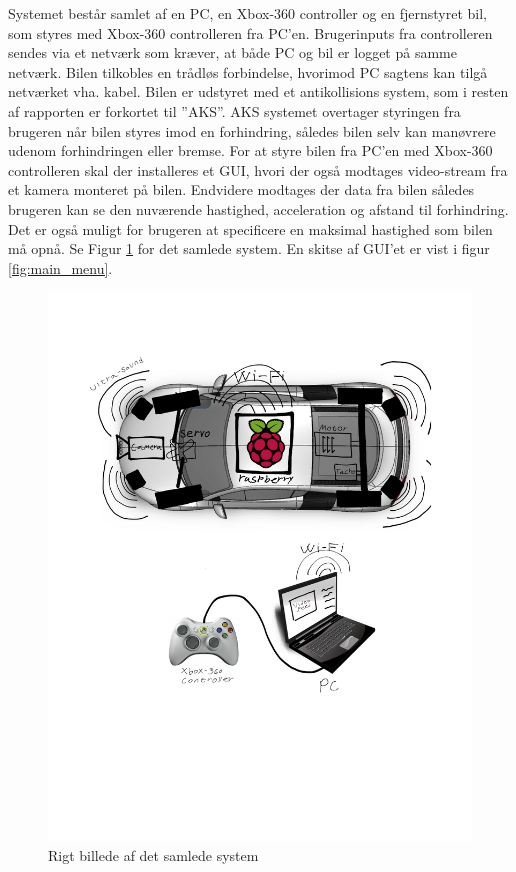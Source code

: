 Systemet består samlet af en PC, en Xbox-360 controller og en fjernstyret bil, som styres med Xbox-360 controlleren fra PC'en. Brugerinputs fra controlleren sendes via et netværk som kræver, at både PC og bil er logget på samme netværk. Bilen tilkobles en trådløs forbindelse, hvorimod PC sagtens kan tilgå netværket vha. kabel. Bilen er udstyret med et antikollisions system, som i resten af rapporten er forkortet til ''AKS''. AKS systemet overtager styringen fra brugeren når bilen styres imod en forhindring, således bilen selv kan manøvrere udenom forhindringen eller bremse. For at styre bilen fra PC'en med Xbox-360 controlleren skal der installeres et GUI, hvori der også modtages video-stream fra et kamera monteret på bilen. Endvidere modtages der data fra bilen således brugeren kan se den nuværende hastighed, acceleration og afstand til forhindring. Det er også muligt for brugeren at specificere en maksimal hastighed som bilen må opnå. Se Figur \ref{fig:rigbillede} for det samlede system. En skitse af GUI'et er vist i figur \ref{fig:main_menu}.
\begin{figure}[H]
\centering
\includegraphics[width=\textwidth - 7.38 cm]{../fig/billeder/rigbillede}
\caption{Rigt billede af det samlede system}
\label{fig:rigbillede}
\end{figure} 
